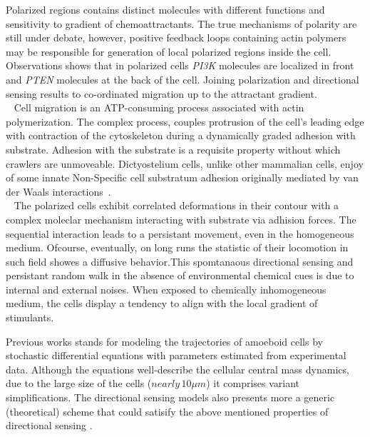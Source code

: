 \documentclass[10pt,letterpaper]{article}
\begin{document}
 Polarized regions contains distinct molecules with different functions and sensitivity to gradient of chemoattractants. The true mechanisms of polarity are still under debate, however, positive feedback loops containing actin polymers may be responsible for generation of local polarized regions inside the cell\cite{pol1,pol2,pol3}. Observations shows that in polarized cells \textit{PI3K} molecules are localized in front and \textit{PTEN} molecules at the back of the cell\cite{pol4,pol5}. Joining polarization and directional sensing results to co-ordinated migration up to the attractant gradient.\\~ Cell migration is an ATP-consuming process  associated with actin polymerization. The complex process, couples  protrusion of the cell’s leading edge with contraction of the cytoskeleton during a dynamically graded adhesion with substrate. Adhesion with the substrate is a requisite property without which crawlers are unmoveable. Dictyostelium cells, unlike other mammalian cells, enjoy of some innate Non-Specific cell substratum adhesion originally mediated by van der Waals interactions~\cite{Rappel-2012}. \\~ The polarized cells exhibit correlated deformations in their contour with a complex moleclar mechanism interacting with substrate via adhision forces. The sequential interaction leads to a persistant movement, even in the homogeneous medium. Ofcourse, eventually, on long runs the statistic of their locomotion in such field showes a diffusive behavior.This spomtanaous directional sensing and persistant random walk in the absence of environmental chemical cues is due to internal and external noises. When exposed to chemically inhomogeneous medium, the cells display a tendency to align with the local gradient of stimulants. 


Previous works stands for modeling the trajectories of amoeboid cells by stochastic differential equations with parameters estimated from experimental data. Although the equations well-describe the cellular central mass dynamics, due to the large size of the cells ($  nearly\, 10 \mu m$) it comprises variant simplifications.  The directional sensing models also  presents more a generic (theoretical) scheme that could satisify the above mentioned properties of directional sensing . \\~
\end{document}
